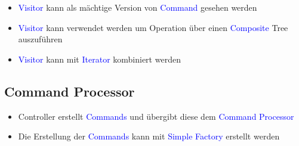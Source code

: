 \begin{itemize}
    \item \textcolor{blue}{Visitor} kann als mächtige Version von \textcolor{blue}{Command} gesehen werden
    \item \textcolor{blue}{Visitor} kann verwendet werden um Operation über einen \textcolor{blue}{Composite} Tree auszuführen
    \item \textcolor{blue}{Visitor} kann mit \textcolor{blue}{Iterator} kombiniert werden
\end{itemize}

\subsection{Command Processor}

\begin{itemize}
    \item Controller erstellt \textcolor{blue}{Commands} und übergibt diese dem \textcolor{blue}{Command Processor}
    \item Die Erstellung der \textcolor{blue}{Commands} kann mit \textcolor{blue}{Simple Factory} erstellt werden
\end{itemize}
